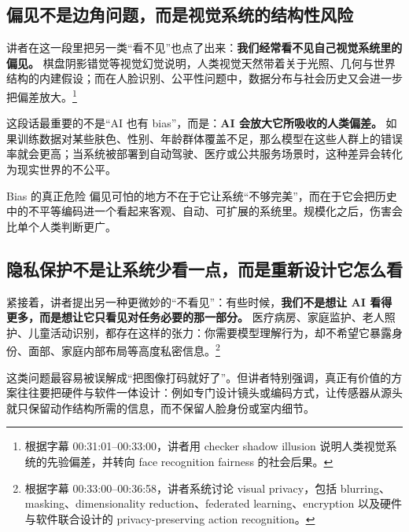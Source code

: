 \documentclass[a4paper]{article}
\begin{document}
\subsection{偏见不是边角问题，而是视觉系统的结构性风险}

讲者在这一段里把另一类``看不见''也点了出来：\textbf{我们经常看不见自己视觉系统里的偏见。} 棋盘阴影错觉等视觉幻觉说明，人类视觉天然带着关于光照、几何与世界结构的内建假设；而在人脸识别、公平性问题中，数据分布与社会历史又会进一步把偏差放大。\footnote{根据字幕 00:31:01--00:33:00，讲者用 checker shadow illusion 说明人类视觉系统的先验偏差，并转向 face recognition fairness 的社会后果。}

这段话最重要的不是``AI 也有 bias''，而是：\textbf{AI 会放大它所吸收的人类偏差。} 如果训练数据对某些肤色、性别、年龄群体覆盖不足，那么模型在这些人群上的错误率就会更高；当系统被部署到自动驾驶、医疗或公共服务场景时，这种差异会转化为现实世界的不公平。

\begin{importantbox}{Bias 的真正危险}
偏见可怕的地方不在于它让系统``不够完美''，而在于它会把历史中的不平等编码进一个看起来客观、自动、可扩展的系统里。规模化之后，伤害会比单个人类判断更广。
\end{importantbox}

\subsection{隐私保护不是让系统少看一点，而是重新设计它怎么看}

紧接着，讲者提出另一种更微妙的``不看见''：有些时候，\textbf{我们不是想让 AI 看得更多，而是想让它只看见对任务必要的那一部分。} 医疗病房、家庭监护、老人照护、儿童活动识别，都存在这样的张力：你需要模型理解行为，却不希望它暴露身份、面部、家庭内部布局等高度私密信息。\footnote{根据字幕 00:33:00--00:36:58，讲者系统讨论 visual privacy，包括 blurring、masking、dimensionality reduction、federated learning、encryption 以及硬件与软件联合设计的 privacy-preserving action recognition。}

这类问题最容易被误解成``把图像打码就好了''。但讲者特别强调，真正有价值的方案往往要把硬件与软件一体设计：例如专门设计镜头或编码方式，让传感器从源头就只保留动作结构所需的信息，而不保留人脸身份或室内细节。
\end{document}
